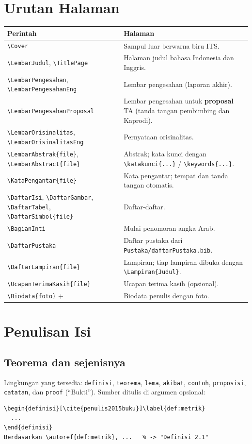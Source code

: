 \documentclass[11pt,a4paper]{article}
\newcommand{\cmd}[1]{\texttt{\textbackslash #1}}
\newcommand{\file}[1]{\texttt{#1}}
\begin{document}
\section{Urutan Halaman}
\begin{longtable}{@{}p{5.2cm}p{9.8cm}@{}}
\toprule
\textbf{Perintah} & \textbf{Halaman} \\ \midrule
\endhead
\cmd{Cover} & Sampul luar berwarna biru ITS. \\
\cmd{LembarJudul}, \cmd{TitlePage} & Halaman judul bahasa Indonesia dan Inggris. \\
\cmd{LembarPengesahan}, \cmd{LembarPengesahanEng} & Lembar pengesahan (laporan akhir). \\
\cmd{LembarPengesahanProposal} & Lembar pengesahan untuk \textbf{proposal} TA (tanda tangan pembimbing dan Kaprodi). \\
\cmd{LembarOrisinalitas}, \cmd{LembarOrisinalitasEng} & Pernyataan orisinalitas. \\
\cmd{LembarAbstrak\{file\}}, \cmd{LembarAbstract\{file\}} & Abstrak; kata kunci dengan \cmd{katakunci\{...\}} / \cmd{keywords\{...\}}. \\
\cmd{KataPengantar\{file\}} & Kata pengantar; tempat dan tanda tangan otomatis. \\
\cmd{DaftarIsi}, \cmd{DaftarGambar}, \cmd{DaftarTabel}, \cmd{DaftarSimbol\{file\}} & Daftar-daftar. \\
\cmd{BagianInti} & Mulai penomoran angka Arab. \\
\cmd{DaftarPustaka} & Daftar pustaka dari \file{Pustaka/daftarPustaka.bib}. \\
\cmd{DaftarLampiran\{file\}} & Lampiran; tiap lampiran dibuka dengan \cmd{Lampiran\{Judul\}}. \\
\cmd{UcapanTerimaKasih\{file\}} & Ucapan terima kasih (opsional). \\
\cmd{Biodata\{foto\}} + \verb|| & Biodata penulis dengan foto. \\
\bottomrule
\end{longtable}

\section{Penulisan Isi}
\subsection*{Teorema dan sejenisnya}
Lingkungan yang tersedia: \texttt{definisi}, \texttt{teorema}, \texttt{lema}, \texttt{akibat}, \texttt{contoh}, \texttt{proposisi}, \texttt{catatan}, dan \texttt{proof} (``Bukti''). Sumber ditulis di argumen opsional:
\begin{lstlisting}
\begin{definisi}[\cite{penulis2015buku}]\label{def:metrik}
  ...
\end{definisi}
Berdasarkan \autoref{def:metrik}, ...   % -> "Definisi 2.1"
\end{lstlisting}
\end{document}
